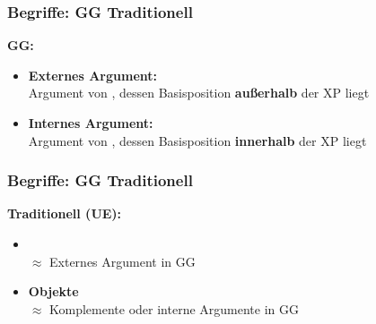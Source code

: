 \begin{frame}
\frametitle{Begriffe: GG \vs Traditionell}

\begin{minipage}[b]{0.47\textwidth}

	\textbf{GG:}
	\begin{itemize}
		\item \textbf{Externes Argument:}\\
		Argument von , dessen Basisposition \textbf{außerhalb} der XP liegt
\medskip
		\item \textbf{Internes Argument:}\\
		Argument von , dessen Basisposition \textbf{innerhalb} der XP liegt
	\end{itemize}	
\end{minipage}  
\begin{minipage}[b]{0.48\textwidth}
	\begin{figure}
	\centering
	\end{figure}	
\end{minipage}

\end{frame}


\begin{frame}
\frametitle{Begriffe: GG \vs Traditionell}

\begin{minipage}[b]{0.4\textwidth}

	\textbf{Traditionell (UE):}
		\begin{itemize}
		\item {}\\
		$\approx$ Externes Argument in GG
\medskip
		\item \textbf{Objekte}\\
		$\approx$ Komplemente oder interne Argumente in GG
		\end{itemize}	
\end{minipage}  
\begin{minipage}[b]{0.55\textwidth}
	\begin{figure}
	\centering
	\end{figure}	
\end{minipage}

\end{frame}


